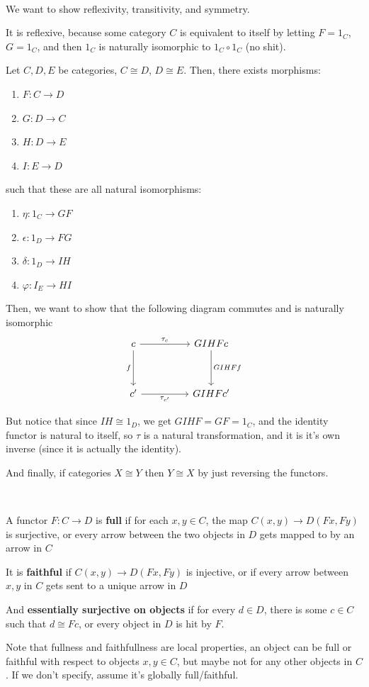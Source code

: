 \documentclass{article}
\begin{document}
\begin{customproof}
\

We want to show reflexivity, transitivity, and symmetry. 

It is reflexive, because some category $C$ is equivalent to itself by letting $F = 1_C$, $G = 1_C$, and then $1_C$ is naturally isomorphic to $1_C \circ 1_C$ (no shit).

Let $C, D, E$ be categories, $C \cong D$, $D \cong E$. Then, there exists morphisms: \begin{enumerate}
    \item $F: C \to D$
    \item $G: D \to C$
    \item $H: D \to E$
    \item $I: E \to D$
\end{enumerate}such that these are all natural isomorphisms:
\begin{enumerate}
    \item $\eta: 1_C \to GF$
    \item $\epsilon: 1_D \to FG$
    \item $\delta: 1_D \to IH$
    \item $\varphi: I_E \to HI$
\end{enumerate}

Then, we want to show that the following diagram commutes and is naturally isomorphic \[\begin{tikzcd}
	c && GIHF c\\
    \\
    c' && GIHF c'
    \arrow[from=1-1, to=1-3, "\tau_c"]
    \arrow[from=1-3, to=3-3, "GIHFf"]
    \arrow[from=1-1, to=3-1, "f"']
    \arrow[from=3-1, to=3-3, "\tau_{c'}"']
\end{tikzcd}\]

But notice that since $IH \cong 1_D$, we get $GIHF = GF = 1_C$, and the identity functor is natural to itself, so $\tau$ is a natural transformation, and it is it's own inverse (since it is actually the identity).

And finally, if categories $X \cong Y$ then $Y \cong X$ by just reversing the functors. 
\end{customproof}

\begin{definition}
\

A functor $F:C \to D$ is \textbf{full} if for each $x,y \in C$, the map $C(x,y) \to D(Fx, Fy)$ is surjective, or every arrow between the two objects in $D$ gets mapped to by an arrow in $C$

It is \textbf{faithful} if $C(x,y) \to D(Fx, Fy)$ is injective, or if every arrow between $x,y$ in $C$ gets sent to a unique arrow in $D$

And \textbf{essentially surjective on objects} if for every $d \in D$, there is some $c \in C$ such that $d \cong Fc$, or every object in $D$ is hit by $F$.     

Note that fullness and faithfullness are local properties, an object can be full or faithful with respect to objects $x,y \in C$, but maybe not for any other objects in $C$. If we don't specify, assume it's globally full/faithful.
\end{definition}
\end{document}
